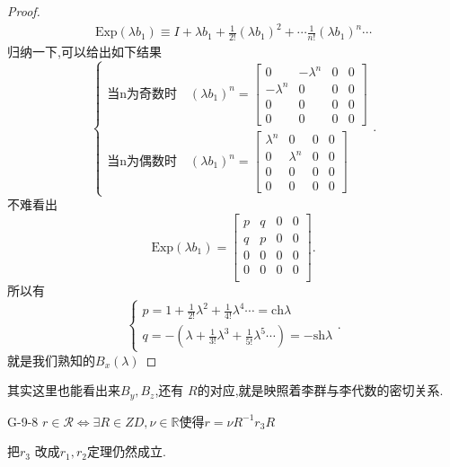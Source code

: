 \documentclass[../main.tex]{subfiles}
\begin{document}
\begin{proof}
  \begin{align*}
   \text{Exp}(\lambda b_1) \equiv I + \lambda b_1 + \frac{1}{2!}(\lambda b_1)^2 + \cdots \frac{1}{n!}(\lambda b_1)^n \cdots
  \end{align*}
  归纳一下,可以给出如下结果
  \[\begin{cases}
    \text{当n为奇数时}\quad (\lambda b_1)^n = \begin{bmatrix} 0&-\lambda^n &0&0\\ -\lambda^n &0&0&0\\0&0&0&0\\0&0&0&0 \end{bmatrix} \\
  \text{当n为偶数时}\quad (\lambda b_1)^n = \begin{bmatrix} \lambda^n & 0&0&0\\ 0 & \lambda^n& 0 & 0 \\ 0&0&0&0\\ 0&0&0&0\end{bmatrix} 
   \end{cases}.\]
   不难看出\[
     \text{Exp}(\lambda b_1) = \begin{bmatrix} p & q & 0 &0\\ q & p & 0&0\\ 0&0&0&0\\0&0&0&0\\ \end{bmatrix}  
   .\] 
   所以有\[
  \begin{cases}
    p = 1 + \frac{1}{2!}\lambda^2 + \frac{1}{4!}\lambda^4 \cdots  = \text{ch}\lambda\\
    q = -(\lambda  + \frac{1}{3!}\lambda^3 + \frac{1}{5!}\lambda^5 \cdots ) = -\text{sh}\lambda
  \end{cases} 
   .\] 
   就是我们熟知的$B_x(\lambda)$
\end{proof}
\begin{note}
  其实这里也能看出来$B_y,B_z$,还有 $R$的对应,就是映照着李群与李代数的密切关系.
\end{note}
\begin{theorem}
  {}{G-9-8} 
  $r \in  \mathscr{R} \Leftrightarrow \exists R \in ZD, \nu \in \mathbb{R} $使得$r = \nu R^{-1}r_3R$
\end{theorem}
\begin{note}
  把$r_3$ 改成$r_1,r_2$定理仍然成立.
\end{note}
\end{document}
